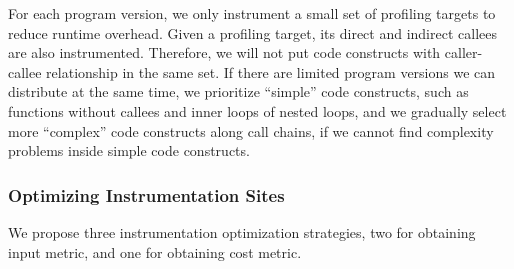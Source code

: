 For each program version, we only instrument a small set of profiling targets
to reduce runtime overhead.
Given a profiling target,
its direct and indirect callees are also instrumented. 
Therefore, we will not put code constructs with caller-callee 
relationship in the same set. 
If there are limited program versions we can distribute at the same time,
we prioritize ``simple'' code constructs, such as 
functions without callees and inner loops of nested loops,
and we gradually select more ``complex'' code constructs along call chains, 
if we cannot find complexity problems inside simple code constructs.




\subsubsection{Optimizing Instrumentation Sites}
\label{sec:site_opt}


We propose three instrumentation optimization strategies, 
two for obtaining input metric, and one for obtaining cost metric. 


